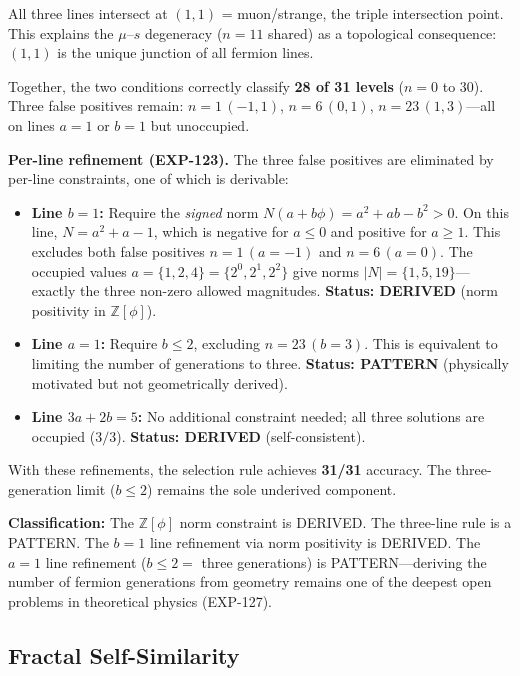 \documentclass[12pt,a4paper]{article}
\begin{document}
All three lines intersect at $(1,1)$ = muon/strange, the triple intersection point. This explains the $\mu$--$s$ degeneracy ($n=11$ shared) as a topological consequence: $(1,1)$ is the unique junction of all fermion lines.

Together, the two conditions correctly classify \textbf{28 of 31 levels} ($n = 0$ to $30$). Three false positives remain: $n = 1\,(-1,1)$, $n = 6\,(0,1)$, $n = 23\,(1,3)$---all on lines $a=1$ or $b=1$ but unoccupied.

\textbf{Per-line refinement (EXP-123).} The three false positives are eliminated by per-line constraints, one of which is derivable:
\begin{itemize}
    \item \textbf{Line $b = 1$:} Require the \emph{signed} norm $N(a + b\phi) = a^2 + ab - b^2 > 0$. On this line, $N = a^2 + a - 1$, which is negative for $a \leq 0$ and positive for $a \geq 1$. This excludes both false positives $n = 1\,(a=-1)$ and $n = 6\,(a=0)$. The occupied values $a = \{1, 2, 4\} = \{2^0, 2^1, 2^2\}$ give norms $|N| = \{1, 5, 19\}$---exactly the three non-zero allowed magnitudes. \textbf{Status: DERIVED} (norm positivity in $\mathbb{Z}[\phi]$).
    \item \textbf{Line $a = 1$:} Require $b \leq 2$, excluding $n = 23\,(b=3)$. This is equivalent to limiting the number of generations to three. \textbf{Status: PATTERN} (physically motivated but not geometrically derived).
    \item \textbf{Line $3a + 2b = 5$:} No additional constraint needed; all three solutions are occupied ($3/3$). \textbf{Status: DERIVED} (self-consistent).
\end{itemize}

With these refinements, the selection rule achieves \textbf{31/31} accuracy. The three-generation limit ($b \leq 2$) remains the sole underived component.

\textbf{Classification:} The $\mathbb{Z}[\phi]$ norm constraint is DERIVED. The three-line rule is a PATTERN. The $b = 1$ line refinement via norm positivity is DERIVED. The $a = 1$ line refinement ($b \leq 2 =$ three generations) is PATTERN---deriving the number of fermion generations from geometry remains one of the deepest open problems in theoretical physics (EXP-127).

\subsection{Fractal Self-Similarity}
\end{document}
